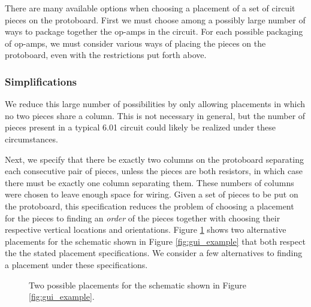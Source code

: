 There are many available options when choosing a placement of a set of circuit
pieces on the protoboard.
First we must choose among a possibly large number of ways
to package together the op-amps in the circuit.
For each possible packaging of
op-amps, we must consider various ways of placing the pieces on the protoboard,
even with the restrictions put forth above.

\subsubsection{Simplifications}

We reduce this large number of possibilities by only allowing placements in
which no
two pieces share a column. This is not necessary in general, but the
number of pieces present in a typical 6.01 circuit could likely be realized
under these circumstances.

Next, we specify that there be exactly two columns on the protoboard separating
each consecutive pair of pieces, unless the pieces are both resistors, in which
case there must be exactly one column separating them. These numbers of columns
were chosen to leave enough space for wiring. Given a set of pieces to be put on
the protoboard, this specification reduces the
problem of choosing a placement for the pieces to finding an \emph{order} of the
pieces together with choosing their respective vertical locations and
orientations. Figure \ref{fig:sample_placements} shows two alternative
placements for the schematic shown in Figure \ref{fig:gui_example} that both
respect the
the stated placement specifications. We consider a few alternatives to finding a
placement under these specifications.

\begin{figure}
\caption{Two possible placements for the schematic shown in Figure
\ref{fig:gui_example}.}
\label{fig:sample_placements}
\end{figure}

